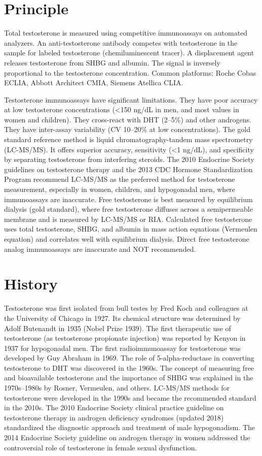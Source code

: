\section*{Principle}
Total testosterone is measured using competitive immunoassays on automated analyzers. An anti-testosterone antibody competes with testosterone in the sample for labeled testosterone (chemiluminescent tracer). A displacement agent releases testosterone from SHBG and albumin. The signal is inversely proportional to the testosterone concentration. Common platforms: Roche Cobas ECLIA, Abbott Architect CMIA, Siemens Atellica CLIA.

Testosterone immunoassays have significant limitations. They have poor accuracy at low testosterone concentrations (<150 ng/dL in men, and most values in women and children). They cross-react with DHT (2--5\%) and other androgens. They have inter-assay variability (CV 10--20\% at low concentrations). The gold standard reference method is liquid chromatography-tandem mass spectrometry (LC-MS/MS). It offers superior accuracy, sensitivity (<1 ng/dL), and specificity by separating testosterone from interfering steroids. The 2010 Endocrine Society guidelines on testosterone therapy and the 2013 CDC Hormone Standardization Program recommend LC-MS/MS as the preferred method for testosterone measurement, especially in women, children, and hypogonadal men, where immunoassays are inaccurate. Free testosterone is best measured by equilibrium dialysis (gold standard), where free testosterone diffuses across a semipermeable membrane and is measured by LC-MS/MS or RIA. Calculated free testosterone uses total testosterone, SHBG, and albumin in mass action equations (Vermeulen equation) and correlates well with equilibrium dialysis. Direct free testosterone analog immunoassays are inaccurate and NOT recommended.

\section*{History}
Testosterone was first isolated from bull testes by Fred Koch and colleagues at the University of Chicago in 1927. Its chemical structure was determined by Adolf Butenandt in 1935 (Nobel Prize 1939). The first therapeutic use of testosterone (as testosterone propionate injection) was reported by Kenyon in 1937 for hypogonadal men. The first radioimmunoassay for testosterone was developed by Guy Abraham in 1969. The role of 5-alpha-reductase in converting testosterone to DHT was discovered in the 1960s. The concept of measuring free and bioavailable testosterone and the importance of SHBG was explained in the 1970s--1980s by Rosner, Vermeulen, and others. LC-MS/MS methods for testosterone were developed in the 1990s and became the recommended standard in the 2010s. The 2010 Endocrine Society clinical practice guideline on testosterone therapy in androgen deficiency syndromes (updated 2018) standardized the diagnostic approach and treatment of male hypogonadism. The 2014 Endocrine Society guideline on androgen therapy in women addressed the controversial role of testosterone in female sexual dysfunction.

